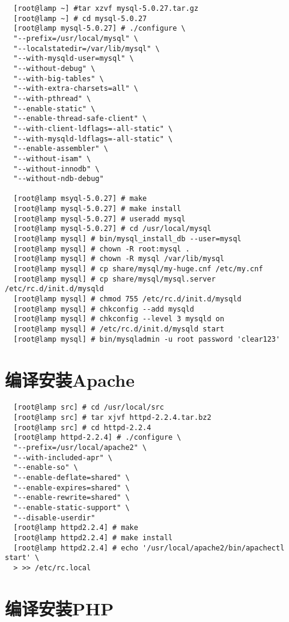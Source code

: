 \small{
\begin{verbatim}
  [root@lamp ~] #tar xzvf mysql-5.0.27.tar.gz
  [root@lamp ~] # cd mysql-5.0.27
  [root@lamp mysql-5.0.27] # ./configure \
  "--prefix=/usr/local/mysql" \
  "--localstatedir=/var/lib/mysql" \
  "--with-mysqld-user=mysql" \
  "--without-debug" \
  "--with-big-tables" \
  "--with-extra-charsets=all" \
  "--with-pthread" \
  "--enable-static" \
  "--enable-thread-safe-client" \
  "--with-client-ldflags=-all-static" \
  "--with-mysqld-ldflags=-all-static" \
  "--enable-assembler" \
  "--without-isam" \
  "--without-innodb" \
  "--without-ndb-debug"
  
  [root@lamp msyql-5.0.27] # make
  [root@lamp mysql-5.0.27] # make install
  [root@lamp mysql-5.0.27] # useradd mysql
  [root@lamp mysql-5.0.27] # cd /usr/local/mysql
  [root@lamp mysql] # bin/mysql_install_db --user=mysql
  [root@lamp mysql] # chown -R root:mysql .
  [root@lamp mysql] # chown -R mysql /var/lib/mysql
  [root@lamp mysql] # cp share/mysql/my-huge.cnf /etc/my.cnf
  [root@lamp mysql] # cp share/mysql/mysql.server /etc/rc.d/init.d/mysqld
  [root@lamp mysql] # chmod 755 /etc/rc.d/init.d/mysqld
  [root@lamp mysql] # chkconfig --add mysqld
  [root@lamp mysql] # chkconfig --level 3 mysqld on
  [root@lamp mysql] # /etc/rc.d/init.d/mysqld start
  [root@lamp mysql] # bin/mysqladmin -u root password 'clear123'
\end{verbatim}
}
\normalsize

\section{编译安装Apache}

\small{
\begin{verbatim}
  [root@lamp src] # cd /usr/local/src
  [root@lamp src] # tar xjvf httpd-2.2.4.tar.bz2
  [root@lamp src] # cd httpd-2.2.4
  [root@lamp httpd-2.2.4] # ./configure \
  "--prefix=/usr/local/apache2" \
  "--with-included-apr" \
  "--enable-so" \
  "--enable-deflate=shared" \
  "--enable-expires=shared" \
  "--enable-rewrite=shared" \
  "--enable-static-support" \
  "--disable-userdir"
  [root@lamp httpd2.2.4] # make
  [root@lamp httpd2.2.4] # make install
  [root@lamp httpd2.2.4] # echo '/usr/local/apache2/bin/apachectl start' \
  > >> /etc/rc.local
\end{verbatim}
}
\normalsize

\section{编译安装PHP}

